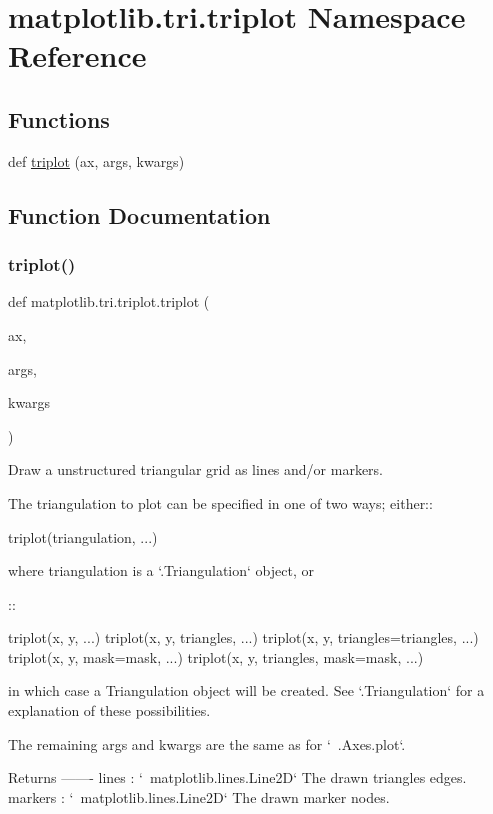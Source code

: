 \hypertarget{namespacematplotlib_1_1tri_1_1triplot}{}\section{matplotlib.\+tri.\+triplot Namespace Reference}
\label{namespacematplotlib_1_1tri_1_1triplot}
\subsection*{Functions}
\begin{DoxyCompactItemize}
\item 
def \hyperlink{namespacematplotlib_1_1tri_1_1triplot_ac0c63b00c159f861397ec32f6aba303a}{triplot} (ax, args, kwargs)
\end{DoxyCompactItemize}


\subsection{Function Documentation}
\mbox{\label{namespacematplotlib_1_1tri_1_1triplot_ac0c63b00c159f861397ec32f6aba303a}} 
\subsubsection{\texorpdfstring{triplot()}{triplot()}}
{\footnotesize\ttfamily def matplotlib.\+tri.\+triplot.\+triplot (\begin{DoxyParamCaption}\item[{}]{ax,  }\item[{}]{args,  }\item[{}]{kwargs }\end{DoxyParamCaption})}

\begin{DoxyVerb}Draw a unstructured triangular grid as lines and/or markers.

The triangulation to plot can be specified in one of two ways; either::

  triplot(triangulation, ...)

where triangulation is a `.Triangulation` object, or

::

  triplot(x, y, ...)
  triplot(x, y, triangles, ...)
  triplot(x, y, triangles=triangles, ...)
  triplot(x, y, mask=mask, ...)
  triplot(x, y, triangles, mask=mask, ...)

in which case a Triangulation object will be created.  See `.Triangulation`
for a explanation of these possibilities.

The remaining args and kwargs are the same as for `~.Axes.plot`.

Returns
-------
lines : `~matplotlib.lines.Line2D`
    The drawn triangles edges.
markers : `~matplotlib.lines.Line2D`
    The drawn marker nodes.
\end{DoxyVerb}
 